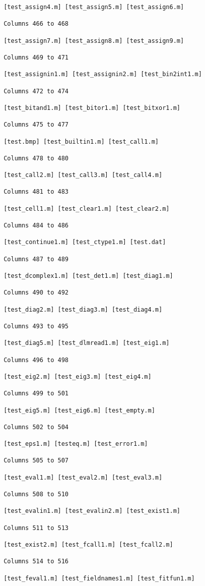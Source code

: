 \begin{verbatim}
 [test_assign4.m] [test_assign5.m] [test_assign6.m] 

 Columns 466 to 468

 [test_assign7.m] [test_assign8.m] [test_assign9.m] 

 Columns 469 to 471

 [test_assignin1.m] [test_assignin2.m] [test_bin2int1.m] 

 Columns 472 to 474

 [test_bitand1.m] [test_bitor1.m] [test_bitxor1.m] 

 Columns 475 to 477

 [test.bmp] [test_builtin1.m] [test_call1.m] 

 Columns 478 to 480

 [test_call2.m] [test_call3.m] [test_call4.m] 

 Columns 481 to 483

 [test_cell1.m] [test_clear1.m] [test_clear2.m] 

 Columns 484 to 486

 [test_continue1.m] [test_ctype1.m] [test.dat] 

 Columns 487 to 489

 [test_dcomplex1.m] [test_det1.m] [test_diag1.m] 

 Columns 490 to 492

 [test_diag2.m] [test_diag3.m] [test_diag4.m] 

 Columns 493 to 495

 [test_diag5.m] [test_dlmread1.m] [test_eig1.m] 

 Columns 496 to 498

 [test_eig2.m] [test_eig3.m] [test_eig4.m] 

 Columns 499 to 501

 [test_eig5.m] [test_eig6.m] [test_empty.m] 

 Columns 502 to 504

 [test_eps1.m] [testeq.m] [test_error1.m] 

 Columns 505 to 507

 [test_eval1.m] [test_eval2.m] [test_eval3.m] 

 Columns 508 to 510

 [test_evalin1.m] [test_evalin2.m] [test_exist1.m] 

 Columns 511 to 513

 [test_exist2.m] [test_fcall1.m] [test_fcall2.m] 

 Columns 514 to 516

 [test_feval1.m] [test_fieldnames1.m] [test_fitfun1.m] 


\end{verbatim}
